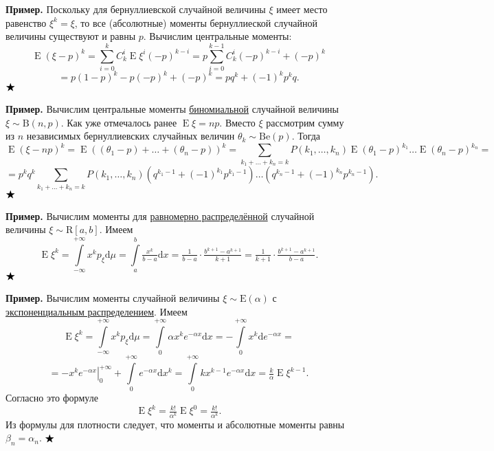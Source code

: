 \documentclass[12pt]{article}
\numberwithin{theorem}{section}
\theoremstyle{definition}
\newenvironment{example}{\indent \textbf{Пример.}}{$ \hfill \bigstar $}
\newcommand{\expect}{\operatorname{E}}
\newcommand{\diff}{\mathrm{d}}
\begin{document}
	\begin{example}
		Поскольку для бернуллиевской случайной величины $ \xi $ имеет место равенство
		$ \xi^k = \xi $, то все (абсолютные) моменты бернуллиеской случайной величины существуют и равны $ p $.
		Вычислим центральные моменты:
		$$ \expect(\xi - p)^k = \sum\limits_{i = 0}^{k} C_k^i \expect\xi^i (-p)^{k - i}
		= p\sum\limits_{i = 0}^{k - 1} C_k^i (-p)^{k - i} + (-p)^k $$ 
		$$ = p(1 - p)^{k} - p(-p)^k + (-p)^k = pq^k + (-1)^kp^kq. $$
	\end{example}
	
	\begin{example}
		Вычислим центральные моменты 
		\hyperlink{binomial-distribution}{биномиальной} случайной величины $ \xi \sim \mathrm{B}(n, p) $.
		Как уже отмечалось ранее $ \expect\xi = np $.
		Вместо $ \xi $ рассмотрим сумму из $ n $ независимых бернуллиевских случайных величин $ \theta_k \sim \mathrm{Be}(p) $.
		Тогда
		$$ \expect(\xi - np)^k = \expect((\theta_1 - p) + \ldots + (\theta_n - p))^k
		= \sum\limits_{k_1 + \ldots + k_n = k} P(k_1, \ldots, k_n) 
		\expect(\theta_1 - p)^{k_1}\ldots\expect(\theta_n - p)^{k_n} =  $$
		$$ = p^kq^k \sum\limits_{k_1 + \ldots + k_n = k} 
		P(k_1, \ldots, k_n)(q^{k_1 - 1} + (-1)^{k_1}p^{k_1 - 1})\ldots(q^{k_n - 1} + (-1)^{k_n}p^{k_n - 1}). $$
	\end{example}
	
	\begin{example}
		Вычислим моменты для 
		\hyperlink{uniformly-distributed}{равномерно распределённой} случайной величины $ \xi \sim \mathrm{R}[a, b] $.
		Имеем
		$$ \expect\xi^k = \int\limits_{-\infty}^{+\infty} x^k p_\xi \diff\mu
		= \int\limits_{a}^{b} \tfrac{x^k}{b - a} \diff x
		= \tfrac{1}{b - a} \cdot \tfrac{b^{k + 1} - a^{k + 1}}{k + 1}
		= \tfrac{1}{k + 1} \cdot \tfrac{b^{k + 1} - a^{k + 1}}{b - a}. $$
	\end{example}
	
	\begin{example}
		Вычислим моменты случайной величины $ \xi \sim \mathrm{E}(\alpha) $ 
		с \hyperlink{exponential-distribution}{экспоненциальным распределением}.
		Имеем
		$$ \expect\xi^k = \int\limits_{-\infty}^{+\infty} x^k p_\xi \diff\mu
		= \int\limits_{0}^{+\infty} \alpha x^k e^{-\alpha x} \diff x
		= -\int\limits_{0}^{+\infty} x^k \diff e^{-\alpha x} = $$ 
		$$ = \left.-x^ke^{-\alpha x}\right|_{0}^{+\infty} 
		+ \int\limits_{0}^{+\infty} e^{-\alpha x}\diff x^k
		= \int\limits_{0}^{+\infty} kx^{k - 1} e^{-\alpha x}\diff x
		= \tfrac{k}{\alpha}\expect\xi^{k - 1}. $$
		Согласно это формуле
		$$ \expect\xi^k = \tfrac{k!}{\alpha^k} \expect\xi^0 = \tfrac{k!}{\alpha^k}. $$
		Из формулы для плотности следует, что моменты и абсолютные моменты равны $ \beta_n = \alpha_n $.
	\end{example}
	
\end{document}
